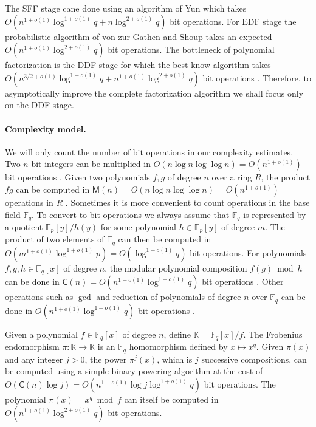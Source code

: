 \documentclass{article}
\theoremstyle{plain}
\theoremstyle{definition}
\def\K{\ensuremath{\mathbb{K}}}
\def\F{\ensuremath{\mathbb{F}}}
\def\MM{\ensuremath{\mathsf{M}}}
\def\CC{\ensuremath{\mathsf{C}}}
\begin{document}
The SFF stage cane done using an algorithm of Yun \cite{yun1976square} which takes $O(n^{1 + 
o(1)}\log^{1 + o(1)}q + n\log^{2 + o(1)}q)$ bit operations. For EDF stage the probabilistic 
algorithm of von zur Gathen and Shoup \cite{von1992computing} takes an expected $O(n^{1 + 
o(1)}\log^{2 + o(1)}q)$ bit operations. The bottleneck of polynomial factorization is the DDF 
stage for which the best know algorithm takes $O(n^{3/2 + o(1)}\log^{1 + o(1)}q + n^{1 + o(1)} 
\log^{2 + o(1)}q)$ bit operations \cite{kedlaya2011fast}. Therefore, to asymptotically improve the 
complete factorization algorithm we shall focus only on the DDF stage.

\paragraph{Complexity model.}
We will only count the number of bit operations in our complexity estimates. Two $n$-bit integers 
can be multiplied in $O(n\log n \log\log n) = O(n^{1 + o(1)})$ bit operations \cite{vzGG}. Given 
two polynomials $f, g$ of degree $n$ over a ring $R$, the product $fg$ can be computed in $\MM(n) = 
O(n\log n \log\log n) = O(n^{1 + o(1)})$ operations in $R$ \cite{vzGG}. Sometimes it is more 
convenient to count operations in the base field $\F_q$. To convert to bit operations we always 
assume that $\F_q$ is represented by a quotient $\F_p[y] / h(y)$ for some polynomial $h \in \F_p[y]$ 
of degree $m$. The product of two elements of $\F_q$ can then be computed in $O(m^{1 + o(1)}\log^{1 
+ o(1)}p) = O(\log^{1 + o(1)}q)$ bit operations. For polynomials $f, g, h \in \F_q[x]$ of degree 
$n$, the modular polynomial composition $f(g) \bmod h$ can be done in $\CC(n) = O(n^{1 + o(1)} 
\log^{1 + o(1)}q)$ bit operations \cite{kedlaya2011fast}. Other operations such as $\gcd$ and 
reduction of polynomials of degree $n$ over $\F_q$ can be done in $O(n^{1 + o(1)} \log^{1 + 
o(1)}q)$ bit operations \cite{vzGG}. 

Given a polynomial $f \in \F_q[x]$ of degree $n$, define $\K = \F_q[x] / f$. The Frobenius 
endomorphism $\pi: \K \rightarrow \K$ is an $\F_q$ homomorphism defined by $x \mapsto x^q$. Given 
$\pi(x)$ and any integer $j > 0$, the power $\pi^{j}(x)$, which is $j$ successive compositions, can 
be computed using a simple binary-powering algorithm at the cost of $O(\CC(n) \log j) = O(n^{1 + 
o(1)} \log j \log^{1 + o(1)}q)$ bit operations. The polynomial $\pi(x) = x^q \bmod f$ can itself be 
computed in $O(n^{1 + o(1)} \log^{2 + o(1)}q)$ bit operations.
\end{document}

